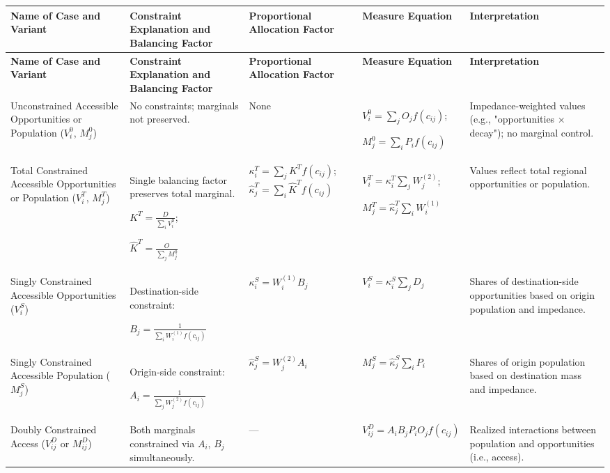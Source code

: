 {\tiny
\begin{longtable}{|p{2.5cm}|p{2.5cm}|p{2.5cm}|p{3cm}|p{3cm}|}
\hline
\textbf{Name of Case and Variant} & \textbf{Constraint Explanation and Balancing Factor} & \textbf{Proportional Allocation Factor} & \textbf{Measure Equation} & \textbf{Interpretation} \\
\hline
\endfirsthead

\hline
\textbf{Name of Case and Variant} & \textbf{Constraint Explanation and Balancing Factor} & \textbf{Proportional Allocation Factor} & \textbf{Measure Equation} & \textbf{Interpretation} \\
\hline
\endhead

Unconstrained Accessible Opportunities or Population ($V_i^0$, $M_j^0$)
& No constraints; marginals not preserved.
& None
& $V_i^0 = \sum_j O_j f(c_{ij})$;

$M_j^0 = \sum_i P_i f(c_{ij})$

& Impedance-weighted values (e.g., "opportunities × decay"); no marginal control. \\
\hline

Total Constrained Accessible Opportunities or Population ($V_i^T$, $M_j^T$)
& Single balancing factor preserves total marginal.

$K^T = \frac{D}{\sum_i V_i^0}$;

$\hat{K}^T = \frac{O}{\sum_j M_j^0}$

& $\kappa_i^T = \sum_j K^T f(c_{ij})$; $\hat{\kappa}_j^T = \sum_i \hat K^T f(c_{ij})$
& $V^T_i = \kappa_i^T \sum_j W^{(2)}_j$;

$M_j^T = \hat{\kappa}_j^T \sum_i W^{(1)}_i$

& Values reflect total regional opportunities or population. \\
\hline

Singly Constrained Accessible Opportunities ($V_i^S$)
& Destination-side constraint:

$B_j = \frac{1}{\sum_i W_i^{(1)} f(c_{ij})}$
& $\kappa^S_i = W_i^{(1)} B_j$
& $V^S_i = \kappa^S_i \sum_j D_j$
& Shares of destination-side opportunities based on origin population and impedance. \\
\hline

Singly Constrained Accessible Population ($M_j^S$)
& Origin-side constraint:

$A_i = \frac{1}{\sum_j W_j^{(2)} f(c_{ij})}$

& $\hat \kappa^S_j = W_j^{(2)} A_i$
& $M_j^S = \hat \kappa^S_j \sum_i P_i$
& Shares of origin population based on destination mass and impedance. \\
\hline

Doubly Constrained Access ($V_{ij}^D$ or $M_{ij}^D$)
& Both marginals constrained via $A_i$, $B_j$ simultaneously.
& —
& $V_{ij}^D = A_i B_j P_i O_j f(c_{ij})$
& Realized interactions between population and opportunities (i.e., access). \\
\hline

\end{longtable}
}
